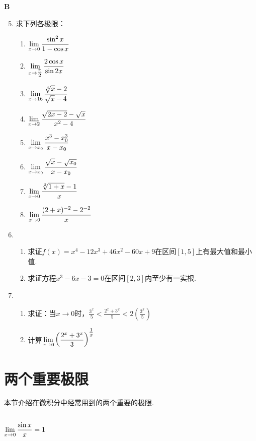 \begin{center}
    \bfseries B
\end{center}
\begin{enumerate}\setcounter{enumi}{4}
    \item 求下列各极限：
\begin{multicols}{2}
\begin{enumerate}[(1)]
    \item $\lim\limits_{x\to  0}\dfrac{\sin^2 x}{1-\cos x}$
    \item $\lim\limits_{x\to \tfrac{\pi}{2}}\dfrac{2\cos x}{\sin 2x}$
    \item $\lim\limits_{x\to 16 }\dfrac{\sqrt[4]{x}-2}{\sqrt{x}-4}$
    \item $\lim\limits_{x\to 2 }\dfrac{\sqrt{2x-2}-\sqrt{x}}{x^2-4}$
    \item $\lim\limits_{x\to  x_0}\dfrac{x^3-x^3_0}{x-x_0}$
    \item $\lim\limits_{x\to x_0 }\dfrac{\sqrt{x}-\sqrt{x_0}}{x-x_0}$
    \item $\lim\limits_{x\to 0 }\dfrac{\sqrt[3]{1+x}-1}{x}$
    \item $\lim\limits_{x\to 0 }\dfrac{(2+x)^{-2}-2^{-2}}{x}$
\end{enumerate}
\end{multicols}

\item \begin{enumerate}[(1)]
    \item 求证$f(x)=x^4-12x^3+46x^2-60x+9$在区间$[1,5]$上有最大值和最小值.
    \item 求证方程$x^3-6x-3=0$在区间$[2,3]$内至少有一实根.
\end{enumerate}

\item \begin{enumerate}[(1)]
 \item 求证：当$x\to 0$时，$\frac{3^x}{5}<\frac{2^x+3^x}{5}<2\left(\frac{3^x}{5}\right)$
    \item 计算$\lim\limits_{x\to 0}\left(\dfrac{2^x+3^x}{3}\right)^{\tfrac{1}{x}}$   
\end{enumerate}
\end{enumerate}

\section{两个重要极限}
本节介绍在微积分中经常用到的两个重要的极限.

\subsection{$\lim\limits_{x\to 0}\dfrac{\sin x}{x}=1$}


